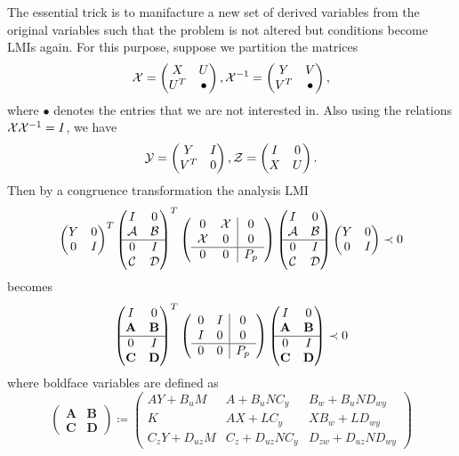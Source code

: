 The essential trick is to manifacture a new set of derived variables from the original variables such that the problem is not altered but 
conditions become LMIs again. For this purpose, suppose we partition the matrices 
\[
\mathcal{X} = \begin{pmatrix}X &U\\U^T &\bullet\end{pmatrix}, \mathcal{X}^{-1} = \begin{pmatrix}Y &V\\V^T &\bullet\end{pmatrix}, 
\]
where $\bullet$ denotes the entries that we are not interested in. Also using the relations $\mathcal{X}\mathcal{X}^{-1}=I$, we have
\[
\mathcal{Y} = \begin{pmatrix}Y&I\\V^T&0\end{pmatrix}, \mathcal{Z} = \begin{pmatrix}I&0\\X&U\end{pmatrix}.
\]
Then by a congruence transformation the analysis LMI
\[
\begin{pmatrix}Y&0\\0&I\end{pmatrix}^T\begin{pmatrix}I&0\\\mathcal{A}&\mathcal{B}\\\hline 0&I\\\mathcal{C}&\mathcal{D}\end{pmatrix}^T
\left(
\begin{array}{cc|c}
	0&\mathcal{X}&0\\\mathcal{X}&0&0\\\hline 0&0&P_p
\end{array}
\right)
\begin{pmatrix}I&0\\\mathcal{A}&\mathcal{B}\\\hline 0&I\\\mathcal{C}&\mathcal{D}\end{pmatrix}\begin{pmatrix}Y&0\\0&I\end{pmatrix}\prec 0
\]
becomes
\begin{equation}
\begin{pmatrix}I&0\\\mathbf{A}&\mathbf{B}\\\hline 0&I\\\mathbf{C}&\mathbf{D}\end{pmatrix}^T
\left(
\begin{array}{cc|c}
	0&I&0\\I&0&0\\\hline 0&0&P_p
\end{array}
\right)
\begin{pmatrix}I&0\\\mathbf{A}&\mathbf{B}\\\hline 0&I\\\mathbf{C}&\mathbf{D}\end{pmatrix} \prec 0
\label{eq:synthnom}
\end{equation}
where boldface variables are defined as 
\[
\left(\begin{array}{c|c}
	\mathbf{A} &\mathbf{B}\\\hline\mathbf{C} &\mathbf{D}
\end{array}\right) \coloneqq \left(
\begin{array}{cc|c}
	AY+B_uM          &A+B_uNC_y     &B_w+B_uND_{wy}\\
	K                &AX+LC_y       &XB_w+LD_{wy}\\\hline
	C_zY+D_{uz}M     &C_z+D_{uz}NC_y &D_{zw}+D_{uz}ND_{wy}
\end{array}
\right)
\]
